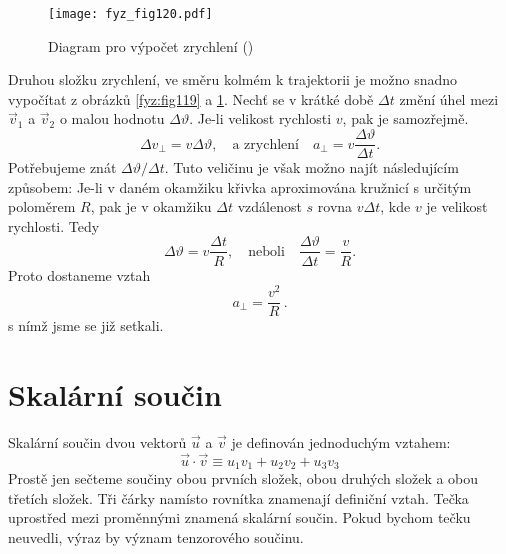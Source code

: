     \begin{figure}[ht!]  %
      \centering
      \texttt{[image: fyz\_fig120.pdf]}
      \caption{Diagram pro výpočet zrychlení
              (\cite[s.~163]{Feynman01})}
      \label{fyz:fig120}
    \end{figure}
    Druhou složku zrychlení, ve směru kolmém k trajektorii je možno snadno vypočítat z obrázků
    \ref{fyz:fig119} a \ref{fyz:fig120}. Nechť se v krátké době \(\Delta t\) změní úhel mezi 
    \(\vec{v}_1\) a \(\vec{v}_2\) o malou hodnotu \(\Delta\vartheta\). Je-li velikost rychlosti 
    \(v\), pak je samozřejmě.    
    \begin{equation*}
      \Delta v_\perp = v\Delta\vartheta, \quad\text{a zrychlení}\quad
      a_\perp = v\frac{\Delta\vartheta}{\Delta t}.
    \end{equation*}
    Potřebujeme znát \(\Delta\vartheta/\Delta t\). Tuto veličinu je však možno najít následujícím 
    způsobem: Je-li v daném okamžiku křivka aproximována kružnicí s určitým poloměrem \(R\), pak je 
    v okamžiku \(\Delta t\) vzdálenost \(s\) rovna \(v\Delta t\), kde \(v\) je velikost rychlosti. 
    Tedy
    \begin{equation*}
      \Delta\vartheta = v\frac{\Delta t}{R}, \quad\text{neboli}\quad
      \frac{\Delta\vartheta}{\Delta t} = \frac{v}{R}.
    \end{equation*}
    Proto dostaneme vztah
    \begin{equation}\label{fyz:eq159}
      \boxed{a_\perp = \frac{v^2}{R}}\,.
    \end{equation}
    s nímž jsme se již setkali.
    
  \section{Skalární součin}
    Skalární součin dvou vektorů \(\vec{u}\) a \(\vec{v}\) je definován jednoduchým vztahem: 
    \begin{equation*}
      \vec{u}\cdot\vec{v} \equiv u_1v_1 + u_2v_2 + u_3v_3
    \end{equation*}
    Prostě jen sečteme součiny obou prvních složek, obou druhých složek a obou třetích složek. Tři
    čárky namísto rovnítka znamenají definiční vztah. Tečka uprostřed mezi proměnnými znamená
    skalární součin. Pokud bychom tečku neuvedli, výraz by význam tenzorového součinu.

